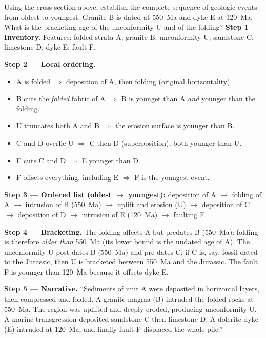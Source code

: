 \documentclass[11pt]{article}
\begin{document}
\begin{exoresolu}
Using the cross-section above, establish the complete sequence of geologic events from oldest to youngest. Granite B is dated at \SI{550}{Ma} and dyke E at \SI{120}{Ma}. What is the bracketing age of the unconformity U and of the folding?
\tcblower
\textbf{Step 1 --- Inventory.} Features: folded strata A; granite B; unconformity U; sandstone C; limestone D; dyke E; fault F.

\textbf{Step 2 --- Local ordering.}
\begin{itemize}
\item A is folded $\Rightarrow$ deposition of A, then folding (original horizontality).
\item B cuts the \emph{folded} fabric of A $\Rightarrow$ B is younger than A \emph{and} younger than the folding.
\item U truncates both A and B $\Rightarrow$ the erosion surface is younger than B.
\item C and D overlie U $\Rightarrow$ C then D (superposition), both younger than U.
\item E cuts C and D $\Rightarrow$ E younger than D.
\item F offsets everything, including E $\Rightarrow$ F is the youngest event.
\end{itemize}

\textbf{Step 3 --- Ordered list (oldest $\to$ youngest):} deposition of A $\to$ folding of A $\to$ intrusion of B (\SI{550}{Ma}) $\to$ uplift and erosion (U) $\to$ deposition of C $\to$ deposition of D $\to$ intrusion of E (\SI{120}{Ma}) $\to$ faulting F.

\textbf{Step 4 --- Bracketing.} The folding affects A but predates B (\SI{550}{Ma}): folding is therefore \emph{older than} \SI{550}{Ma} (its lower bound is the undated age of A). The unconformity U post-dates B (\SI{550}{Ma}) and pre-dates C; if C is, say, fossil-dated to the Jurassic, then U is bracketed between \SI{550}{Ma} and the Jurassic. The fault F is younger than \SI{120}{Ma} because it offsets dyke E.

\textbf{Step 5 --- Narrative.} ``Sediments of unit A were deposited in horizontal layers, then compressed and folded. A granite magma (B) intruded the folded rocks at \SI{550}{Ma}. The region was uplifted and deeply eroded, producing unconformity U. A marine transgression deposited sandstone C then limestone D. A dolerite dyke (E) intruded at \SI{120}{Ma}, and finally fault F displaced the whole pile.''
\end{exoresolu}
\end{document}
